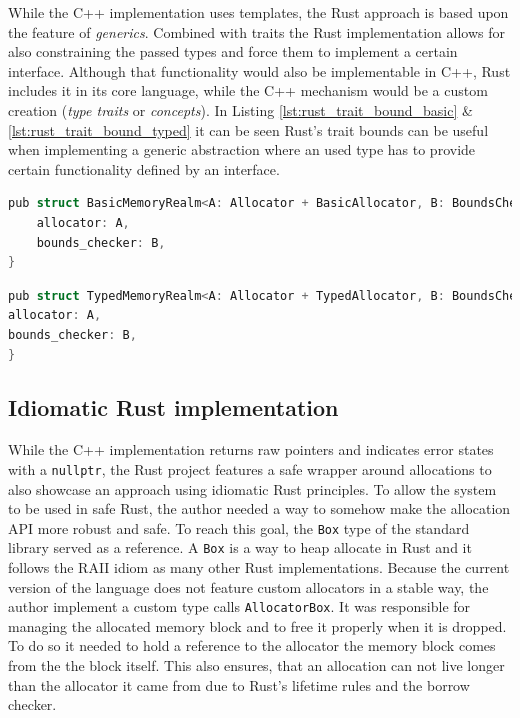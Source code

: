 While the C++ implementation uses templates, the Rust approach is based upon the feature of \textit{generics}. Combined with traits the Rust implementation allows for also constraining the passed types and force them to implement a certain interface. Although that functionality would also be implementable in C++, Rust includes it in its core language, while the C++ mechanism would be a custom creation (\textit{type traits} or \textit{concepts}). In Listing \ref{lst:rust_trait_bound_basic} \& \ref{lst:rust_trait_bound_typed} it can be seen Rust's trait bounds can be useful when implementing a generic abstraction where an used type has to provide certain functionality defined by an interface.\\

\begin{lstlisting}[caption={Rust interface of the basic memory realm allowing only basic allocators.}, label={lst:rust_trait_bound_basic}, language={C++}]
pub struct BasicMemoryRealm<A: Allocator + BasicAllocator, B: BoundsChecker + Default> {
	allocator: A,
	bounds_checker: B,
}
\end{lstlisting}

\begin{lstlisting}[caption={Rust interface of the typed memory realm.}, label={lst:rust_trait_bound_typed}, language={C++}]
pub struct TypedMemoryRealm<A: Allocator + TypedAllocator, B: BoundsChecker + Default> {
allocator: A,
bounds_checker: B,
}
\end{lstlisting}

\subsection{Idiomatic Rust implementation}

While the C++ implementation returns raw pointers and indicates error states with a \texttt{nullptr}, the Rust project features a safe wrapper around allocations to also showcase an approach using idiomatic Rust principles. To allow the system to be used in safe Rust, the author needed a way to somehow make the allocation \ac{API} more robust and safe. To reach this goal, the \texttt{Box} type of the standard library served as a reference. A \texttt{Box} is a way to heap allocate in Rust and it follows the \ac{RAII} idiom as many other Rust implementations. Because the current version of the language does not feature custom allocators in a stable way, the author implement a custom type calls \texttt{AllocatorBox}. It was responsible for managing the allocated memory block and to free it properly when it is dropped. To do so it needed to hold a reference to the allocator the memory block comes from the the block itself. This also ensures, that an allocation can not live longer than the allocator it came from due to Rust's lifetime rules and the borrow checker.\\

